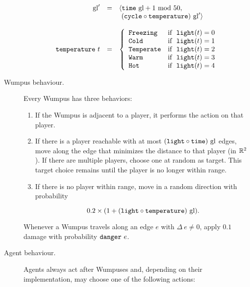 \begin{definition}
\begin{description}
	$$
		\begin{array}{r c l}
			\mathrm{gl}' & = & \langle \mathtt{time}\ \mathrm{gl} + 1\ \mathrm{mod}\ 50,\\
					   &   &       \ (\mathtt{cycle} \circ \mathtt{temperature})\ \mathrm{gl}' \rangle\\
			\\
			\mathtt{temperature}\ t & = &
			\left\{
				\begin{array}{l l}
					\mathtt{Freezing} & \textnormal{if }\ \mathtt{light}(t) = 0\\
					\mathtt{Cold} & \textnormal{if }\ \mathtt{light}(t) = 1\\
					\mathtt{Temperate} & \textnormal{if }\ \mathtt{light}(t) = 2\\
					\mathtt{Warm} & \textnormal{if }\ \mathtt{light}(t) = 3\\
					\mathtt{Hot} & \textnormal{if }\ \mathtt{light}(t) = 4
				\end{array}
			\right.\\
		\end{array}
	$$
	
	\item[Wumpus behaviour.] Every Wumpus has three behaviors:
	
	\begin{enumerate}
		\item If the Wumpus is adjacent to a player, it performs the  action on that player.
		
		\item If there is a player reachable with at most $(\field{light} \circ \field{time})\ \mathrm{gl}$ edges, move along the edge that minimizes the distance to that player (in $\mathbb{R}^2$). If there are multiple players, choose one at random as target. This target choice remains until the player is no longer within range.
		
		\item If there is no player within range, move in a random direction with probability
		
		$$
			0.2 \times (1 + (\mathtt{light} \circ \mathtt{temperature})\ \mathrm{gl}).
		$$
	\end{enumerate}
	
	Whenever a Wumpus travels along an edge $e$ with $\Delta\ e \neq 0$, apply $0.1$ damage with probability $\field{danger}\ e$.
	
	\item[Agent behaviour.] Agents always act after Wumpuses and, depending on their implementation, may choose one of the following actions:
	

\end{description}
\end{definition}
